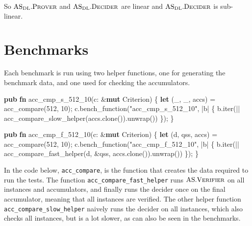 \documentclass[
]{article}
\newenvironment{Shaded}{\begin{snugshade}}{\end{snugshade}}
\newcommand{\DecValTok}[1]{\textcolor[rgb]{0.56,0.25,0.44}{#1}}
\newcommand{\KeywordTok}[1]{\textcolor[rgb]{0.80,0.14,0.11}{\textbf{#1}}}
\newcommand{\NormalTok}[1]{\textcolor[rgb]{0.16,0.16,0.16}{#1}}
\newcommand{\OperatorTok}[1]{\textcolor[rgb]{0.56,0.25,0.44}{#1}}
\newcommand{\StringTok}[1]{\textcolor[rgb]{0.60,0.59,0.10}{#1}}
\newcommand*{\Verifier}{\mathrm{\text{V\scriptsize ERIFIER}}}
\newcommand*{\AS}{\text{AS}}
\newcommand*{\ASVerifier}{\AS.\Verifier}
\newcommand*{\ASDL}{\text{AS}_{\text{DL}}}
\newcommand*{\ASDLProver}{\ASDL.\mathrm{\text{P\scriptsize ROVER}}}
\newcommand*{\ASDLDecider}{\ASDL.\mathrm{\text{D\scriptsize ECIDER}}}
\begin{document}
So \(\ASDLProver\) and \(\ASDLDecider\) are linear and \(\ASDLDecider\)
is sub-linear.

\section{Benchmarks}\label{benchmarks}

Each benchmark is run using two helper functions, one for generating the
benchmark data, and one used for checking the accumulators.

\begin{Shaded}
\begin{Highlighting}[numbers=left,,]
  \KeywordTok{pub} \KeywordTok{fn}\NormalTok{ acc\_cmp\_s\_512\_10(c}\OperatorTok{:} \OperatorTok{\&}\KeywordTok{mut}\NormalTok{ Criterion) }\OperatorTok{\{}
      \KeywordTok{let}\NormalTok{ (\_}\OperatorTok{,}\NormalTok{ \_}\OperatorTok{,}\NormalTok{ accs) }\OperatorTok{=}\NormalTok{ acc\_compare(}\DecValTok{512}\OperatorTok{,} \DecValTok{10}\NormalTok{)}\OperatorTok{;}
\NormalTok{      c}\OperatorTok{.}\NormalTok{bench\_function(}\StringTok{"acc\_cmp\_s\_512\_10"}\OperatorTok{,} \OperatorTok{|}\NormalTok{b}\OperatorTok{|} \OperatorTok{\{}
\NormalTok{          b}\OperatorTok{.}\NormalTok{iter(}\OperatorTok{||}\NormalTok{ acc\_compare\_slow\_helper(accs}\OperatorTok{.}\NormalTok{clone())}\OperatorTok{.}\NormalTok{unwrap())}
      \OperatorTok{\}}\NormalTok{)}\OperatorTok{;}
  \OperatorTok{\}}

  \KeywordTok{pub} \KeywordTok{fn}\NormalTok{ acc\_cmp\_f\_512\_10(c}\OperatorTok{:} \OperatorTok{\&}\KeywordTok{mut}\NormalTok{ Criterion) }\OperatorTok{\{}
      \KeywordTok{let}\NormalTok{ (d}\OperatorTok{,}\NormalTok{ qss}\OperatorTok{,}\NormalTok{ accs) }\OperatorTok{=}\NormalTok{ acc\_compare(}\DecValTok{512}\OperatorTok{,} \DecValTok{10}\NormalTok{)}\OperatorTok{;}
\NormalTok{      c}\OperatorTok{.}\NormalTok{bench\_function(}\StringTok{"acc\_cmp\_f\_512\_10"}\OperatorTok{,} \OperatorTok{|}\NormalTok{b}\OperatorTok{|} \OperatorTok{\{}
\NormalTok{          b}\OperatorTok{.}\NormalTok{iter(}\OperatorTok{||}\NormalTok{ acc\_compare\_fast\_helper(d}\OperatorTok{,} \OperatorTok{\&}\NormalTok{qss}\OperatorTok{,}\NormalTok{ accs}\OperatorTok{.}\NormalTok{clone())}\OperatorTok{.}\NormalTok{unwrap())}
      \OperatorTok{\}}\NormalTok{)}\OperatorTok{;}
  \OperatorTok{\}}
\end{Highlighting}
\end{Shaded}

In the code below, \texttt{acc\_compare}, is the function that creates
the data required to run the tests. The function
\texttt{acc\_compare\_fast\_helper} runs \(\ASVerifier\) on all
instances and accumulators, and finally runs the decider once on the
final accumulator, meaning that all instances are verified. The other
helper function \texttt{acc\_compare\_slow\_helper} naively runs the
decider on all instances, which also checks all instances, but is a lot
slower, as can also be seen in the benchmarks.
\end{document}
